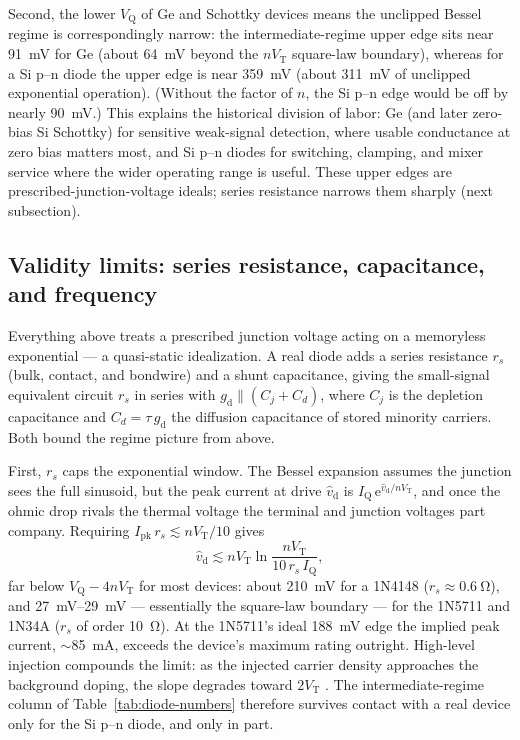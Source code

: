 \documentclass[12pt]{article}
\newcommand{\VT}{V_{\mathrm{T}}}
\newcommand{\VQ}{V_{\mathrm{Q}}}
\newcommand{\IQ}{I_{\mathrm{Q}}}
\newcommand{\gd}{g_{\mathrm{d}}}
\newcommand{\vhd}{\hat{v}_{\mathrm{d}}}
\newcommand{\eu}{\mathrm{e}}        %
\begin{document}
Second, the lower $\VQ$ of Ge and Schottky devices means the unclipped Bessel regime is correspondingly narrow: the intermediate-regime upper edge sits near \SI{91}{\milli\volt} for Ge (about \SI{64}{\milli\volt} beyond the $n\VT$ square-law boundary), whereas for a Si p--n diode the upper edge is near \SI{359}{\milli\volt} (about \SI{311}{\milli\volt} of unclipped exponential operation). (Without the factor of $n$, the Si p--n edge would be off by nearly \SI{90}{\milli\volt}.) This explains the historical division of labor: Ge (and later zero-bias Si Schottky) for sensitive weak-signal detection, where usable conductance at zero bias matters most, and Si p--n diodes for switching, clamping, and mixer service where the wider operating range is useful. These upper edges are prescribed-junction-voltage ideals; series resistance narrows them sharply (next subsection).

\subsection*{Validity limits: series resistance, capacitance, and frequency}

Everything above treats a prescribed junction voltage acting on a memoryless exponential --- a quasi-static idealization. A real diode adds a series resistance $r_s$ (bulk, contact, and bondwire) and a shunt capacitance, giving the small-signal equivalent circuit $r_s$ in series with $\gd \parallel (C_j + C_d)$, where $C_j$ is the depletion capacitance and $C_d = \tau\,\gd$ the diffusion capacitance of stored minority carriers. Both bound the regime picture from above.

First, $r_s$ caps the exponential window. The Bessel expansion assumes the junction sees the full sinusoid, but the peak current at drive $\vhd$ is $\IQ\, \eu^{\vhd/n\VT}$, and once the ohmic drop rivals the thermal voltage the terminal and junction voltages part company. Requiring $I_{\mathrm{pk}}\, r_s \lesssim n\VT/10$ gives
\begin{equation}
\vhd \lesssim n\VT \ln\!\frac{n\VT}{10\, r_s\, \IQ},
\label{eq:rs-limit}
\end{equation}
far below $\VQ - 4n\VT$ for most devices: about \SI{210}{\milli\volt} for a 1N4148 ($r_s \approx \SI{0.6}{\ohm}$), and \SIrange{27}{29}{\milli\volt} --- essentially the square-law boundary --- for the 1N5711 and 1N34A ($r_s$ of order \SI{10}{\ohm}). At the 1N5711's ideal \SI{188}{\milli\volt} edge the implied peak current, $\sim$\SI{85}{\milli\ampere}, exceeds the device's maximum rating outright. High-level injection compounds the limit: as the injected carrier density approaches the background doping, the slope degrades toward $2\VT$ \cite{sze}. The intermediate-regime column of Table~\ref{tab:diode-numbers} therefore survives contact with a real device only for the Si p--n diode, and only in part.
\end{document}
